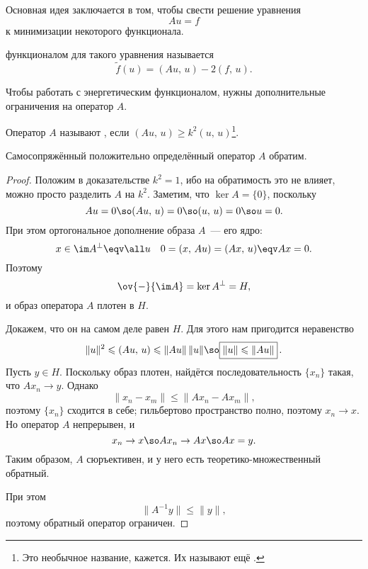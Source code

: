 \documentclass{trlnotes}
\begin{document}
    Основная идея заключается в том, чтобы свести решение уравнения
    \[
        Au = f
    \]
    к минимизации некоторого функционала. 

    \begin{de}
         функционалом для такого уравнения называется
        \[
            \tilde{f}(u) = ( Au, \, u ) - 2(f, \, u).
        \]
    \end{de}

    Чтобы работать с энергетическим функционалом, нужны дополнительные ограничения на оператор $A$.

    \begin{de}
        Оператор $A$ называют , если $(Au, \, u) \geqslant k^2 (u, \, u)$\footnote{Это необычное название, кажется. Их называют ещё .}.
    \end{de}

    \begin{st}
        Самосопряжённый положительно определённый оператор $A$ обратим.
        \begin{proof}
            Положим в доказательстве $k^2 = 1$, ибо на обратимость это не влияет, можно просто разделить $A$ на $k^2$. Заметим, что $\ker A = \{0\}$, поскольку
            \[
                Au = 0 \so (Au, \, u) = 0 \so (u, \, u) = 0 \so u = 0.
            \]
            При этом ортогональное дополнение образа $A$~--- его ядро:
            \[
                x \in \im A^{\perp} \eqv \all u \quad 0 = (x, \, Au) = (Ax, \, u) \eqv Ax = 0.
            \]
            Поэтому
            \[
                \ov{-}{\im A} = \ker A^{\perp} = H,
            \]
            и образ оператора $A$ плотен в $H$.

            Докажем, что он на самом деле равен $H$. Для этого нам пригодится неравенство
            \[
                \|u\|^2 \leqslant (Au, \, u) \leqslant \|Au\| \, \|u\| \so \boxed{\|u\| \leqslant \|Au\|}\,.
            \]
            Пусть $y \in H$. Поскольку образ плотен, найдётся последовательность $\{x_n\}$ такая, что $Ax_n \to y$. Однако
            \[
                \|x_n - x_m\| \leqslant \|Ax_n - Ax_m\|,
            \]
            поэтому $\{x_n\}$ сходится в себе; гильбертово пространство полно, поэтому $x_n \to x$. Но оператор $A$ непрерывен, и
            \[ 
                x_n \to x \so A x_n \to Ax \so Ax = y.
            \]
            Таким образом, $A$ сюръективен, и у него есть теоретико-множественный обратный.

            При этом
            \[
                \|A^{-1}y\| \leqslant \|y\|, 
            \]
            поэтому обратный оператор ограничен.


        \end{proof}
    \end{st}
\end{document}
